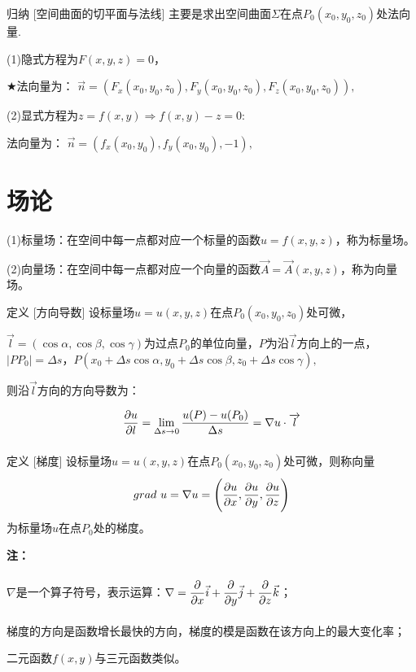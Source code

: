 \documentclass[a4paper,12pt,oneside,fontset=none]{ctexbook}
\let\olddfrac\dfrac
\renewcommand{\dfrac}[2]{
    \olddfrac{#1\vrule width 0pt height 1.15em depth 0em}{#2\vrule width 0pt height 0em depth 0.6em}
}
\let\oldlim\lim
\renewcommand{\lim}{\displaystyle\oldlim}
\newenvironment{induction}[1][]{\begin{thmBox}{归纳}{#1}}{\end{thmBox}}
\newcounter{definition}[chapter]
\newenvironment{definition}[1][]{\begin{defBox}{定义}{#1}}{\end{defBox}}
\newenvironment{note}{
    \par\vspace{0.5em}\noindent
    \textbf{\color{NoteColor} 注：}
}{
    \par\vspace{0.5em}
}
\numberwithin{equation}{chapter}
\begin{document}
\begin{induction}
    [空间曲面的切平面与法线]
    主要是求出空间曲面$\varSigma$在点$P_0(x_0,y_0,z_0)$处法向量.
    
    (1)隐式方程为$F(x,y,z) = 0$，
    
    $\bigstar$法向量为：
    $\vec{n} = (F_x(x_0,y_0,z_0), F_y(x_0,y_0,z_0), F_z(x_0,y_0,z_0)),$

    (2)显式方程为$z = f(x,y)\Longrightarrow f(x,y) - z = 0$:    
    
    法向量为：
    $\vec{n} = (f_x(x_0,y_0), f_y(x_0,y_0), -1),$
    
\end{induction}


\section{场论}
(1)标量场：在空间中每一点都对应一个标量的函数$u = f(x,y,z)$，称为标量场。

(2)向量场：在空间中每一点都对应一个向量的函数$\overrightarrow{A} = \overrightarrow{A}(x,y,z)$，称为向量场。
\begin{definition}
    [方向导数]
    设标量场$u = u(x,y,z)$在点$P_0(x_0,y_0,z_0)$处可微，
    
    $\overrightarrow{l} = (\cos \alpha, \cos \beta, \cos \gamma)$为过点$P_0$的单位向量，$P$为沿$\overrightarrow{l}$方向上的一点，$|PP_0| = \Delta s，P(x_0+\Delta s\cos\alpha, y_0+\Delta s\cos\beta, z_0+\Delta s\cos\gamma),$
    
    则沿$\overrightarrow{l}$方向的方向导数为：
    $$\dfrac{\partial u}{\partial l} = \lim_{\Delta s\to 0}\dfrac{u(P) - u(P_0)}{\Delta s} = \nabla u \cdot \overrightarrow{l}$$
\end{definition}

\begin{definition}
    [梯度]
    设标量场$u = u(x,y,z)$在点$P_0(x_0,y_0,z_0)$处可微，则称向量
    $$grad \ u = \nabla u = \left(\dfrac{\partial u}{\partial x}, \dfrac{\partial u}{\partial y}, \dfrac{\partial u}{\partial z}\right)$$
    为标量场$u$在点$P_0$处的梯度。
\end{definition}
\begin{note}
    $\nabla$是一个算子符号，表示运算：$\nabla = \dfrac{\partial}{\partial x}\vec{i} + \dfrac{\partial}{\partial y}\vec{j} + \dfrac{\partial}{\partial z}\vec{k}$；

    梯度的方向是函数增长最快的方向，梯度的模是函数在该方向上的最大变化率；

    二元函数$f(x,y)$与三元函数类似。
\end{note}
\end{document}
